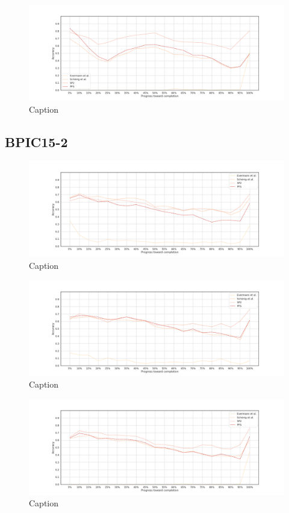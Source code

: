 \begin{figure}[!htb]
    \centering
    \includegraphics[width=\textwidth]{gfx/stability/bpic2015_1/windowed_stability.png}
    \caption{Caption}
    \label{fig:my_label}
\end{figure}

\FloatBarrier
\subsection{BPIC15-2}
\begin{figure}[!htb]
    \centering
    \includegraphics[width=\textwidth]{gfx/stability/bpic2015_2/individual_stability.png}
    \caption{Caption}
    \label{fig:my_label}
\end{figure}
\begin{figure}[!htb]
    \centering
    \includegraphics[width=\textwidth]{gfx/stability/bpic2015_2/grouped_stability.png}
    \caption{Caption}
    \label{fig:my_label}
\end{figure}
\begin{figure}[!htb]
    \centering
    \includegraphics[width=\textwidth]{gfx/stability/bpic2015_2/padded_stability.png}
    \caption{Caption}
    \label{fig:my_label}
\end{figure}
